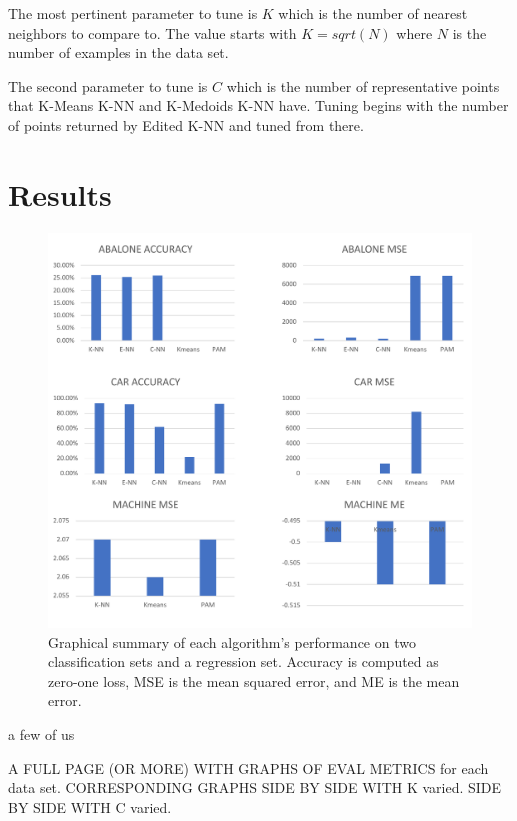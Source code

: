 \documentclass[twoside,11pt]{article}
\begin{document}
The most pertinent parameter to tune is $K$ which is the number of nearest neighbors to compare to. The value starts with $K = sqrt(N)$ where $N$ is the number of examples in the data set. 

The second parameter to tune is $C$ which is the number of representative points that K-Means K-NN and K-Medoids K-NN have. Tuning begins with the number of points returned by Edited K-NN and tuned from there. 

\section{Results}


\begin{figure}
	\includegraphics[width=\linewidth]{comparisongraphs.pdf}
	\caption{Graphical summary of each algorithm's performance on two classification sets and a regression set. Accuracy is computed as zero-one loss, MSE is the mean squared error, and ME is the mean error.}
	\label{fig:comparealgs}
\end{figure}

a few of us

A FULL PAGE (OR MORE) WITH GRAPHS OF EVAL METRICS for each data set. CORRESPONDING GRAPHS SIDE BY SIDE WITH K varied. SIDE BY SIDE WITH C varied.
\end{document}
